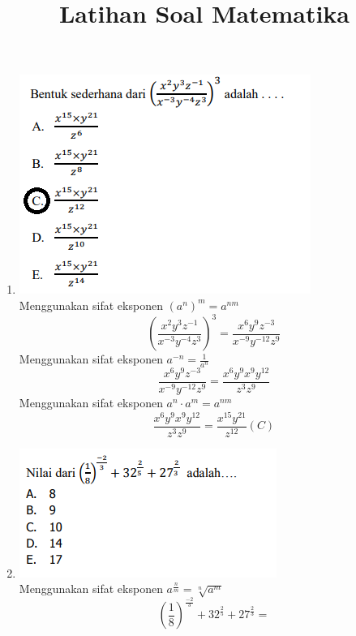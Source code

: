 \documentclass{article}
\title{Latihan Soal Matematika}
\begin{document}
\maketitle

\begin{enumerate}
    \item \begin{minipage}[t]{\linewidth}
          \raggedright
            \includegraphics[valign=t]{1.png}\\
						Menggunakan sifat eksponen $(a^n)^m = a^{nm}$
						\[
							\left(\frac{x^{2}y^{3}z^{-1}}{x^{-3}y^{-4}z^{3}}\right)^3 = 
							\frac{x^{6}y^{9}z^{-3}}{x^{-9}y^{-12}z^{9}}
						\]
						Menggunakan sifat eksponen $a^{-n}=\frac{1}{a^n}$
						\[
							\frac{x^{6}y^{9}z^{-3}}{x^{-9}y^{-12}z^{9}} =
							\frac{x^{6}y^{9}x^{9}y^{12}}{z^{3}z^{9}}
						\]
						Menggunakan sifat eksponen $a^{n}\cdot a^{m}=a^{nm}$
						\[
							\frac{x^{6}y^{9}x^{9}y^{12}}{z^{3}z^{9}} = 
							\frac{x^{15} y^{21}}{z^{12}} \left(C\right)
						\]
					\end{minipage}
				\item \begin{minipage}[t]{\linewidth}
					\raggedright
						\includegraphics[valign=t]{2.png} \\
						Menggunakan sifat eksponen $a^{\frac{n}{m}}=\sqrt[n]{a^m}$
						\[
							\left(\frac{1}{8}\right)^{\frac{-2}{3}}+32^{\frac{2}{5}}+27^{\frac{2}{3}} = 
\]
\end{minipage}
\end{enumerate}
\end{document}
